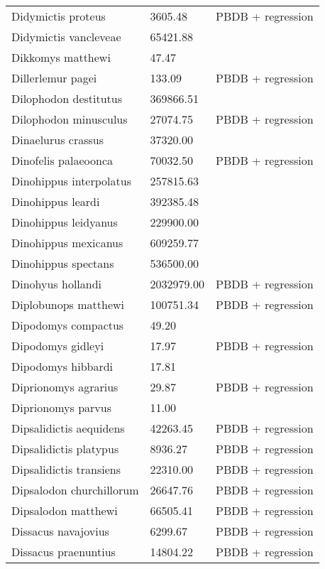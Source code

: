 \documentclass{article}
\begin{document}
\begin{center}
\begin{longtable}{p{} p{} p{} }
  Didymictis proteus & 3605.48 & PBDB + regression \\ 
  Didymictis vancleveae & 65421.88 & \cite{Scott2004} \\ 
  Dikkomys matthewi & 47.47 & \cite{Tomiya2013} \\ 
  Dillerlemur pagei & 133.09 & PBDB + regression \\ 
  Dilophodon destitutus & 369866.51 & \cite{Sinclair1915} \\ 
  Dilophodon minusculus & 27074.75 & PBDB + regression \\ 
  Dinaelurus crassus & 37320.00 & \cite{McKenna2011} \\ 
  Dinofelis palaeoonca & 70032.50 & PBDB + regression \\ 
  Dinohippus interpolatus & 257815.63 & \cite{Tomiya2013} \\ 
  Dinohippus leardi & 392385.48 & \cite{Tomiya2013} \\ 
  Dinohippus leidyanus & 229900.00 & \cite{MacFadden1986} \\ 
  Dinohippus mexicanus & 609259.77 & \cite{Tomiya2013} \\ 
  Dinohippus spectans & 536500.00 & \cite{McKenna2011} \\ 
  Dinohyus hollandi & 2032979.00 & PBDB + regression \\ 
  Diplobunops matthewi & 100751.34 & PBDB + regression \\ 
  Dipodomys compactus & 49.20 & \cite{Smith2004} \\ 
  Dipodomys gidleyi & 17.97 & PBDB + regression \\ 
  Dipodomys hibbardi & 17.81 & \cite{Tomiya2013} \\ 
  Diprionomys agrarius & 29.87 & PBDB + regression \\ 
  Diprionomys parvus & 11.00 & \cite{McKenna2011} \\ 
  Dipsalidictis aequidens & 42263.45 & PBDB + regression \\ 
  Dipsalidictis platypus & 8936.27 & PBDB + regression \\ 
  Dipsalidictis transiens & 22310.00 & PBDB + regression \\ 
  Dipsalodon churchillorum & 26647.76 & PBDB + regression \\ 
  Dipsalodon matthewi & 66505.41 & PBDB + regression \\ 
  Dissacus navajovius & 6299.67 & PBDB + regression \\ 
  Dissacus praenuntius & 14804.22 & PBDB + regression \\ 

\end{longtable}
\end{center}
\end{document}

